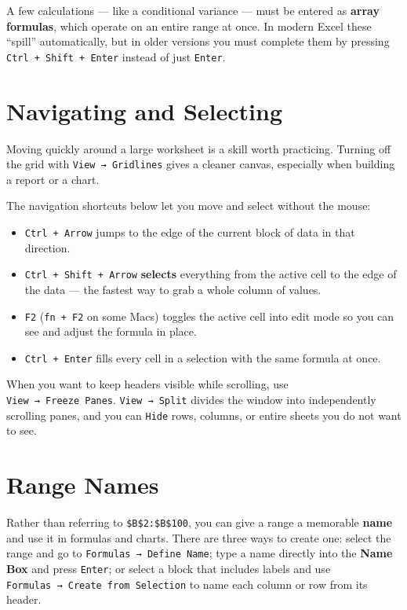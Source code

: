 \documentclass[
  11pt,
  letterpaper,
  DIV=11,
  numbers=noendperiod,
  oneside,
  open=any]{scrreprt}
\providecommand{\tightlist}{%
  \setlength{\itemsep}{0pt}\setlength{\parskip}{0pt}}\usepackage{longtable,booktabs,array}
\begin{document}
A few calculations --- like a conditional variance --- must be entered
as \textbf{array formulas}, which operate on an entire range at once. In
modern Excel these ``spill'' automatically, but in older versions you
must complete them by pressing \texttt{Ctrl\ +\ Shift\ +\ Enter} instead
of just \texttt{Enter}.

\section{Navigating and Selecting}\label{navigating-and-selecting}

Moving quickly around a large worksheet is a skill worth practicing.
Turning off the grid with \texttt{View\ →\ Gridlines} gives a cleaner
canvas, especially when building a report or a chart.

The navigation shortcuts below let you move and select without the
mouse:

\begin{itemize}
\tightlist
\item
  \texttt{Ctrl\ +\ Arrow} jumps to the edge of the current block of data
  in that direction.
\item
  \texttt{Ctrl\ +\ Shift\ +\ Arrow} \textbf{selects} everything from the
  active cell to the edge of the data --- the fastest way to grab a
  whole column of values.
\item
  \texttt{F2} (\texttt{fn\ +\ F2} on some Macs) toggles the active cell
  into edit mode so you can see and adjust the formula in place.
\item
  \texttt{Ctrl\ +\ Enter} fills every cell in a selection with the same
  formula at once.
\end{itemize}

When you want to keep headers visible while scrolling, use
\texttt{View\ →\ Freeze\ Panes}. \texttt{View\ →\ Split} divides the
window into independently scrolling panes, and you can \texttt{Hide}
rows, columns, or entire sheets you do not want to see.

\section{Range Names}\label{range-names}

Rather than referring to \texttt{\$B\$2:\$B\$100}, you can give a range
a memorable \textbf{name} and use it in formulas and charts. There are
three ways to create one: select the range and go to
\texttt{Formulas\ →\ Define\ Name}; type a name directly into the
\textbf{Name Box} and press \texttt{Enter}; or select a block that
includes labels and use \texttt{Formulas\ →\ Create\ from\ Selection} to
name each column or row from its header.
\end{document}
